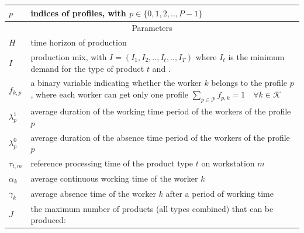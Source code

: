 \documentclass[review,12pt, 3p, times]{elsarticle}
\begin{document}
\begin{longtable}{p{} p{}}
	$p$           & indices of profiles, with $p\in\{0,1,2,..,P-1\}$                                                                                                                                                                                       \\
	\hline
	\multicolumn{2}{c}{Parameters}\\
	\hline
	$H$           & time horizon of production                                 \\
	$I$           & production mix, with $I=(I_1,I_2,..,I_t,..,I_T)$ where $I_t$ is the minimum demand for the type of product $t$ and .                                                                                                                   \\
	$f_{k,p}$     & a binary variable indicating whether the worker $k$  belongs to the profile $p$, where each worker can get only one profile $\sum_{p\in\mathcal{P}} f_{p,k} =1  \quad\forall k\in\mathcal{K}$                                          \\
	$\lambda^1_p$ & average duration of the working time period of the workers of the profile $p$                                                                                                                                                          \\
	$\lambda^0_p$ & average duration of the absence time period of the workers of the profile $p$                                                                                                                                                          \\
	$\tau_{t,m}$  & reference processing time of the product type $t$ on workstation $m$                                                                                                                                                                   \\
	$\alpha_k$    & average continuous working time of the worker $k$                                                                                                                                                                                      \\
	$\gamma_k$    & average absence time of the worker $k$ after a period of working time                                                                                                                                                                  \\
	$J$           & the maximum number of products (all types combined) that can be produced:                                                                                                                                                              \\
											

\end{longtable}
\end{document}
